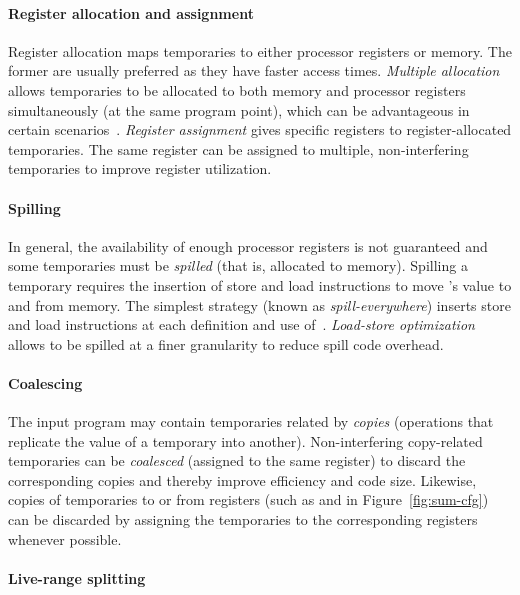 \documentclass[acmsmall,authorversion,nonacm]{acmart}
\begin{document}
\paragraph{Register allocation and assignment}

Register allocation maps temporaries to either processor registers or
memory.
The former are usually preferred as they have faster access times.
\emph{Multiple allocation} allows temporaries to be allocated to both
memory and processor registers simultaneously (at the same program
point), which can be advantageous in certain scenarios~\cite[Section
  2.2]{Colombet2015}.
\emph{Register assignment} gives specific registers to
register-allocated temporaries.
The same register can be assigned to multiple, non-interfering
temporaries to improve register utilization.

\paragraph{Spilling}

In general, the availability of enough processor registers is not
guaranteed and some temporaries must be \emph{spilled} (that is,
allocated to memory).
Spilling a temporary  requires the insertion of store and load
instructions to move 's value to and from memory.
The simplest strategy (known as \emph{spill-everywhere}) inserts store
and load instructions at each definition and use of~.
\emph{Load-store optimization} allows  to be spilled at a finer
granularity to reduce spill code overhead.

\paragraph{Coalescing}

The input program may contain temporaries related by \emph{copies}
(operations that replicate the value of a temporary into another).
Non-interfering copy-related temporaries can be \emph{coalesced}
(assigned to the same register) to discard the corresponding copies
and thereby improve efficiency and code size.
Likewise, copies of temporaries to or from registers (such as
 and
 in
Figure~\ref{fig:sum-cfg}) can be discarded by assigning the
temporaries to the corresponding registers whenever possible.

\paragraph{Live-range splitting}
\end{document}
